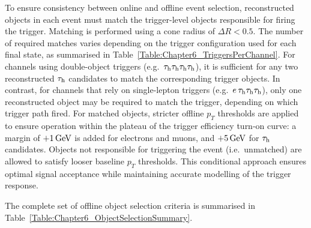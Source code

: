 To ensure consistency between online and offline event selection, reconstructed objects in each event must match the trigger-level objects responsible for firing the trigger. Matching is performed using a cone radius of $\Delta R < 0.5$. The number of required matches varies depending on the trigger configuration used for each final state, as summarised in Table~\ref{Table:Chapter6_TriggersPerChannel}. For channels using double-object triggers (e.g.\ $\tau_\mathrm{h}\tau_\mathrm{h}\tau_\mathrm{h}\tau_\mathrm{h}$), it is sufficient for any two reconstructed $\tau_\mathrm{h}$ candidates to match the corresponding trigger objects. In contrast, for channels that rely on single-lepton triggers (e.g.\ $e\,\tau_\mathrm{h}\tau_\mathrm{h}\tau_\mathrm{h}$), only one reconstructed object may be required to match the trigger, depending on which trigger path fired. For matched objects, stricter offline $p_T$ thresholds are applied to ensure operation within the plateau of the trigger efficiency turn-on curve: a margin of $+1\,\text{Ge\hspace{-.08em}V}$ is added for electrons and muons, and $+5\,\text{Ge\hspace{-.08em}V}$ for $\tau_\mathrm{h}$ candidates. Objects not responsible for triggering the event (i.e.\ unmatched) are allowed to satisfy looser baseline $p_T$ thresholds. This conditional approach ensures optimal signal acceptance while maintaining accurate modelling of the trigger response.

The complete set of offline object selection criteria is summarised in Table~\ref{Table:Chapter6_ObjectSelectionSummary}.

